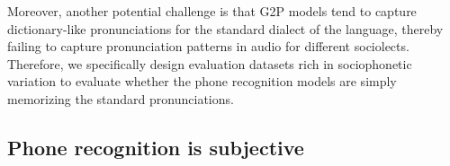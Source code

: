 \documentclass[11pt]{article}
\begin{document}
Moreover, another potential challenge is that G2P models tend to capture dictionary-like pronunciations for the standard dialect of the language, thereby failing to capture pronunciation patterns in audio for different sociolects. Therefore, we specifically design evaluation datasets rich in sociophonetic variation to evaluate whether the phone recognition models are simply memorizing the standard pronunciations. %




\subsection{Phone recognition is subjective}
\end{document}
